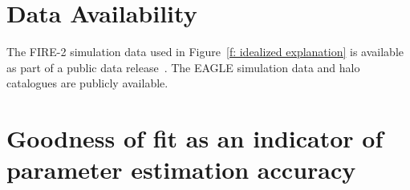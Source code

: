 \documentclass[fleqn,usenatbib]{mnras}
\begin{document}
\section*{Data Availability}

The FIRE-2 simulation data used in Figure~\ref{f: idealized explanation} is available as part of a public data release~\citep{wetzel2022Public}.
The EAGLE simulation data \citep{EagleTeam2017} and halo catalogues \citep{McAlpine2016} are publicly available. 







\appendix

\section{Goodness of fit as an indicator of parameter estimation accuracy}
\label{a: error vs error}
\end{document}
